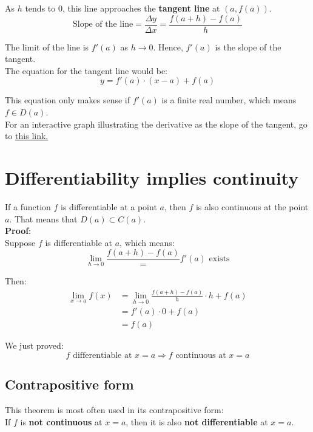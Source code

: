 \documentclass[11pt]{article}
\begin{document}
As \(h\) tends to 0, this line approaches the \textbf{tangent line} at \((a, f(a))\).
\[\text{Slope of the line} = \frac{\Delta y}{\Delta x} = \frac{f(a + h) - f(a)}{h}\]

The limit of the line is \(f'(a)\) as \(h \rightarrow 0\). Hence, \(f'(a)\) is the slope of the tangent.
\\[0pt]

The equation for the tangent line would be:
\[y = f'(a) \cdot (x - a) + f(a)\]

This equation only makes sense if \(f'(a)\) is a finite real number, which means \(f \in D(a)\).
\\[0pt]

For an interactive graph illustrating the derivative as the slope of the tangent, go to \href{https://www.desmos.com/calculator/gdn4qknq1w}{this link.}

\newpage

\section{Differentiability implies continuity}
\label{sec:orgdff2c45}
If a function \(f\) is differentiable at a point \(a\), then \(f\) is also continuous at the point \(a\). That means that \(D(a) \subset C(a)\).
\\[0pt]

\textbf{Proof}:
\\[0pt]

Suppose \(f\) is differentiable at \(a\), which means:
\[\lim_{h \rightarrow 0} \frac{f(a + h) - f(a)} = f'(a) \text{ exists}\]

Then:
\begin{align*}
\lim_{x \rightarrow a} f(x) &= \lim_{h \rightarrow 0} \frac{f(a+h) - f(a)}{h} \cdot h + f(a) \\
&= f'(a) \cdot 0 + f(a) \\
&= f(a)
\end{align*}

We just proved:
\[f \text{ differentiable at } x = a \Rightarrow f \text{ continuous at } x = a\]

\subsection{Contrapositive form}
\label{sec:orgbde2e94}
This theorem is most often used in its contrapositive form:
\\[0pt]

If \(f\) is \textbf{not continuous} at \(x = a\), then it is also \textbf{not differentiable} at \(x = a\).
\end{document}
